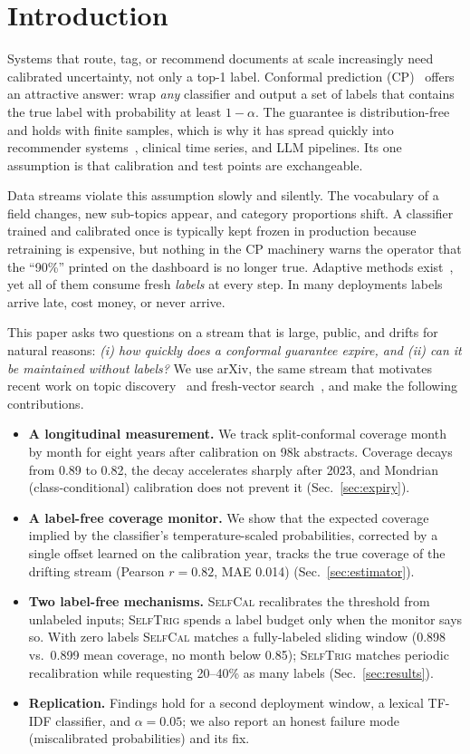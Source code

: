 \documentclass[conference]{IEEEtran}
\newcommand{\selfcal}{\textsc{SelfCal}}
\newcommand{\selftrig}{\textsc{SelfTrig}}
\begin{document}
\section{Introduction}
Systems that route, tag, or recommend documents at scale increasingly need calibrated uncertainty, not only a top-1 label. Conformal prediction (CP)~\cite{vovk2005algorithmic,angelopoulos2023gentle} offers an attractive answer: wrap \emph{any} classifier and output a set of labels that contains the true label with probability at least $1-\alpha$. The guarantee is distribution-free and holds with finite samples, which is why it has spread quickly into recommender systems~\cite{wang2025confidence}, clinical time series, and LLM pipelines. Its one assumption is that calibration and test points are exchangeable.

Data streams violate this assumption slowly and silently. The vocabulary of a field changes, new sub-topics appear, and category proportions shift. A classifier trained and calibrated once is typically kept frozen in production because retraining is expensive, but nothing in the CP machinery warns the operator that the ``90\%'' printed on the dashboard is no longer true. Adaptive methods exist~\cite{gibbs2021adaptive,barber2023beyond,zaffran2022adaptive}, yet all of them consume fresh \emph{labels} at every step. In many deployments labels arrive late, cost money, or never arrive.

This paper asks two questions on a stream that is large, public, and drifts for natural reasons: \emph{(i) how quickly does a conformal guarantee expire, and (ii) can it be maintained without labels?} We use arXiv, the same stream that motivates recent work on topic discovery~\cite{li2025scitopic} and fresh-vector search~\cite{lai2025updatable}, and make the following contributions.
\begin{itemize}
\item \textbf{A longitudinal measurement.} We track split-conformal coverage month by month for eight years after calibration on 98k abstracts. Coverage decays from 0.89 to 0.82, the decay accelerates sharply after 2023, and Mondrian (class-conditional) calibration does not prevent it (Sec.~\ref{sec:expiry}).
\item \textbf{A label-free coverage monitor.} We show that the expected coverage implied by the classifier's temperature-scaled probabilities, corrected by a single offset learned on the calibration year, tracks the true coverage of the drifting stream (Pearson $r{=}0.82$, MAE 0.014) (Sec.~\ref{sec:estimator}).
\item \textbf{Two label-free mechanisms.} \selfcal{} recalibrates the threshold from unlabeled inputs; \selftrig{} spends a label budget only when the monitor says so. With zero labels \selfcal{} matches a fully-labeled sliding window (0.898 vs.\ 0.899 mean coverage, no month below 0.85); \selftrig{} matches periodic recalibration while requesting 20--40\% as many labels (Sec.~\ref{sec:results}).
\item \textbf{Replication.} Findings hold for a second deployment window, a lexical TF-IDF classifier, and $\alpha{=}0.05$; we also report an honest failure mode (miscalibrated probabilities) and its fix.
\end{itemize}
\end{document}
